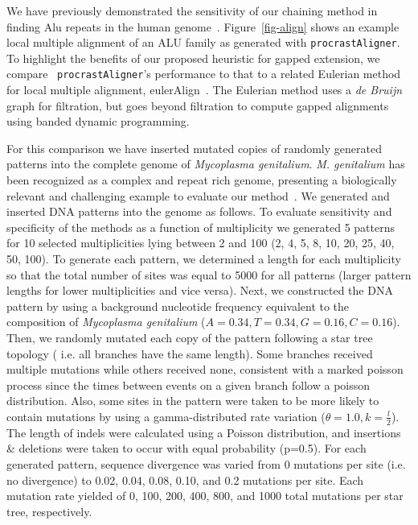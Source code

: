 \documentclass{ws-procs975x65}
\begin{document}
We have previously demonstrated the sensitivity of our chaining method in finding Alu repeats in
the human genome~\cite{ref-procrast}. Figure~\ref{fig-align} shows an example local multiple alignment of an ALU family as generated with \texttt{procrastAligner}. To highlight the benefits of our proposed heuristic for gapped extension, we compare ~\texttt{procrastAligner}'s performance to that to a related Eulerian method for local multiple alignment, eulerAlign~\cite{ref-related1}. The Eulerian method uses
a \textit{de Bruijn} graph for filtration, but goes beyond filtration to compute gapped alignments using banded dynamic
programming. 

For this comparison we have inserted mutated copies of randomly generated patterns into the complete genome of \emph{Mycoplasma genitalium}. \emph{M. genitalium} has been recognized as a complex and repeat rich genome, presenting a biologically relevant and challenging example to evaluate our method~\cite{ref-mycoplasma}. We generated and inserted DNA patterns into the genome as follows. To evaluate sensitivity and specificity of the methods as a function of multiplicity we generated 5 patterns for 10 selected multiplicities lying between 2 and 100 (2, 4, 5, 8, 10, 20, 25, 40, 50, 100). To generate each pattern, we determined a length for each multiplicity so that the total number of sites was equal to 5000 for all patterns (larger pattern lengths for lower multiplicities and vice versa). Next, we constructed the DNA pattern by using a background nucleotide frequency equivalent to the composition of \emph{Mycoplasma genitalium} ($A=0.34,T=0.34,G=0.16,C=0.16$). Then, we randomly mutated each copy of the pattern following a star tree topology ( i.e. all branches have the same length).  Some branches received multiple mutations while others received none, consistent with a marked poisson process since the times between events on a given branch follow a poisson distribution. Also, some sites in the pattern were taken to be more likely to contain mutations by using a gamma-distributed rate variation ($\theta = 1.0, k = \frac{l}{2}$). The length of indels were calculated using a Poisson distribution, and insertions \& deletions were taken to occur with equal probability (p=0.5). For each generated pattern, sequence divergence was varied from 0 mutations per site (i.e. no divergence) to 0.02, 0.04, 0.08, 0.10, and 0.2 mutations per site. Each mutation rate yielded of 0, 100, 200, 400, 800, and 1000 total mutations per star tree, respectively. 
\end{document}

